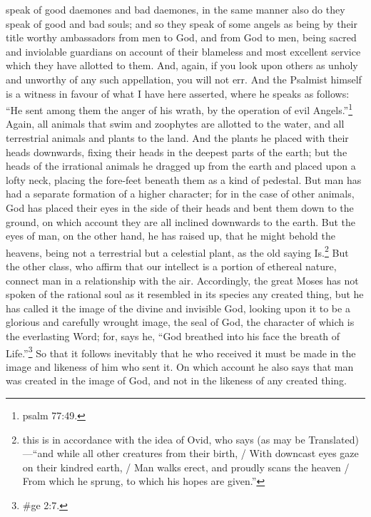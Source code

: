 speak of good daemones and bad daemones, in the same manner also do they speak of good and
bad souls; and so they speak of some angels as being by their title worthy ambassadors from men
to God, and from God to men, being sacred and inviolable guardians on account of their blameless
and most excellent service which they have allotted to them. And, again, if you look upon others as
unholy and unworthy of any such appellation, you will not err. And the Psalmist himself is a witness
in favour of what I have here asserted, where he speaks as follows: ``He sent among them the
anger of his wrath, by the operation of evil Angels.''\footnote{psalm 77:49.} Again, all animals that swim and
zoophytes are allotted to the water, and all terrestrial animals and plants to the land. And the plants
he placed with their heads downwards, fixing their heads in the deepest parts of the earth; but the
heads of the irrational animals he dragged up from the earth and placed upon a lofty neck, placing
the fore-feet beneath them as a kind of pedestal. But man has had a separate formation of a
higher character; for in the case of other animals, God has placed their eyes in the side of their
heads and bent them down to the ground, on which account they are all inclined downwards to the
earth. But the eyes of man, on the other hand, he has raised up, that he might behold the heavens,
being not a terrestrial but a celestial plant, as the old saying Is.\footnote{this is in accordance with the idea of
Ovid, who says (as may be Translated)—``and while all other creatures from their birth, / With downcast eyes gaze on their
kindred earth, / Man walks erect, and proudly scans the heaven / From which he sprung, to which his hopes are given.''}
But the other class, who affirm that our intellect is a portion of ethereal nature, connect man in a
relationship with the air. Accordingly, the great Moses has not spoken of the rational soul as it
resembled in its species any created thing, but he has called it the image of the divine and invisible
God, looking upon it to be a glorious and carefully wrought image, the seal of God, the character of
which is the everlasting Word; for, says he, ``God breathed into his face the breath of
Life.''\footnote{\#ge 2:7.} So that it follows inevitably that he who received it must be made in the image
and likeness of him who sent it. On which account he also says that man was created in the image
of God, and not in the likeness of any created thing.

